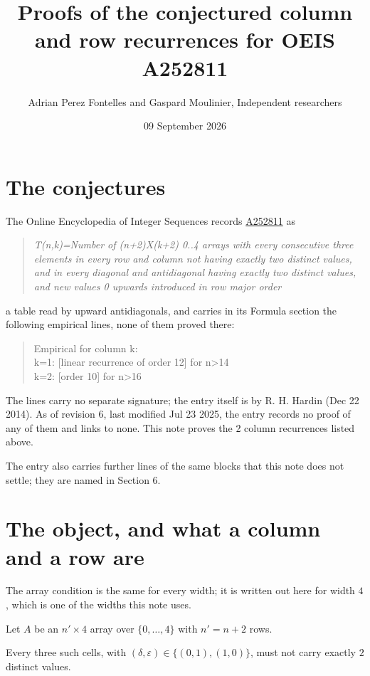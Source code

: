 \documentclass[11pt]{article}
\title{Proofs of the conjectured column and row recurrences for OEIS A252811}
\author{Adrian Perez Fontelles and Gaspard Moulinier, Independent researchers}
\date{09 September 2026}
\theoremstyle{definition}
\begin{document}
\maketitle
\section{The conjectures}

The Online Encyclopedia of Integer Sequences records \href{https://oeis.org/A252811}{A252811} as

\begin{quote}\itshape T(n,k)=Number of (n+2)X(k+2) 0..4 arrays with every consecutive three elements in every row and column not having exactly two distinct values, and in every diagonal and antidiagonal having exactly two distinct values, and new values 0 upwards introduced in row major order\end{quote}

a table read by upward antidiagonals, and carries in its Formula section the following empirical lines, none of them proved there:

\begin{quote}\ttfamily Empirical for column k:\\
k=1: [linear recurrence of order 12] for n>14\\k=2: [order 10] for n>16\end{quote}

The lines carry no separate signature; the entry itself is by R. H. Hardin (Dec 22 2014). As of revision 6, last modified Jul 23 2025, the entry records no proof of any of them and links to none. This note proves the 2 column recurrences listed above.

The entry also carries further lines of the same blocks that this note does not settle; they are named in Section 6.

\section{The object, and what a column and a row are}

The array condition is the same for every width; it is written out here for width $4$, which is one of the widths this note uses.

Let $A$ be an $n' \times 4$ array over $\{0,\dots,4\}$ with $n' = n + 2$ rows.

Every three such cells, with $(\delta,\varepsilon) \in \{(0,1), (1,0)\}$, must not carry exactly $2$ distinct values.
\end{document}
